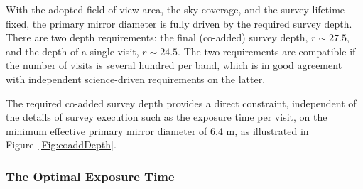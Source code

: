 With the adopted field-of-view area, the sky coverage, and the survey lifetime
fixed, the primary mirror diameter is fully driven by the required survey
depth. There are two depth requirements: the final (co-added) survey depth,
$r\sim27.5$, and the depth of a single visit, $r\sim24.5$. The two
requirements are compatible if the number of visits is several hundred
per band, which is in good agreement with independent science-driven
requirements on the latter.

The required co-added survey depth provides a direct constraint,
independent of the details of survey execution such as the exposure time per visit,
on the minimum effective primary mirror diameter of 6.4 m, as illustrated in
Figure~\ref{Fig:coaddDepth}.



\subsubsection{The Optimal Exposure Time }


